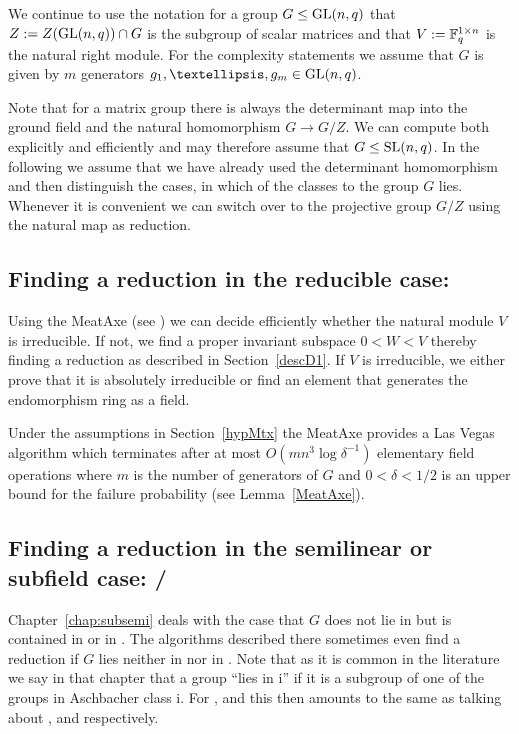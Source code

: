 We continue to use the notation for a group $G \le \GL(n,q)$ that
$Z := Z(\GL(n,q)) \cap G$ is the subgroup of scalar matrices and that
$V := \mathbb{F}_q^{1 \times n}$ is the natural right module. For the
complexity statements we assume that $G$ is given by $m$ generators
$g_1, \ldots, g_m \in \GL(n,q)$.

Note that for a matrix group there is always the determinant map
into the ground field and the natural homomorphism
$G \to G/Z$. We can compute both explicitly and efficiently and may
therefore assume that $G \le \SL(n,q)$.
In the following we assume that we have already used the determinant
homomorphism and then distinguish the cases, in which of the classes
 to  the group $G$ lies. Whenever it is convenient we can
switch over to the projective group $G/Z$ using the natural map 
as reduction.

\subsection{Finding a reduction in the reducible case: }
\label{solveC1}

Using the MeatAxe (see \cite{MeatAxeHoltRees, IL, MeatAxeRP}) we can
decide efficiently whether the natural module $V$ is
irreducible. If not, we find a proper invariant subspace $0<W<V$
thereby finding a reduction as described in Section~\ref{descD1}. 
If $V$ is irreducible, we either prove
that it is absolutely irreducible or find an element that generates
the endomorphism ring as a field.

Under the assumptions in Section~\ref{hypMtx} the MeatAxe provides a
Las Vegas algorithm which terminates
after at most $O(mn^3\log \delta^{-1})$ elementary field operations where $m$
is the number of generators of $G$ and $0 < \delta < 1/2$ is an upper
bound for the failure probability (see Lemma~\ref{MeatAxe}).


\subsection{Finding a reduction in the semilinear or subfield case:
/}
\label{solveC3C5}

Chapter~\ref{chap:subsemi} deals with the case that $G$ does not lie
in  but is contained in  or in . The algorithms described
there sometimes even find a reduction if $G$ lies neither in  nor
in . Note that as it is common in the literature we say in that
chapter that a group ``lies in \CC i'' if it is a subgroup of one of
the groups in Aschbacher class \CC i. For ,  and  this then 
amounts to the same as talking about ,  and  respectively.

